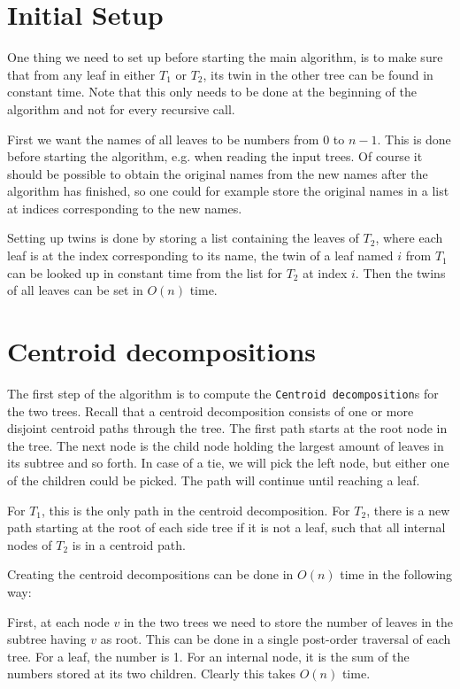 \section{Initial Setup}
One thing we need to set up before starting the main algorithm, is to make sure that from any leaf in either $T_1$ or $T_2$, its twin in the other tree can be found in constant time. Note that this only needs to be done at the beginning of the algorithm and not for every recursive call.

First we want the names of all leaves to be numbers from 0 to $n-1$. This is done before starting the algorithm, e.g. when reading the input trees. Of course it should be possible to obtain the original names from the new names after the algorithm has finished, so one could for example store the original names in a list at indices corresponding to the new names.

Setting up twins is done by storing a list containing the leaves of $T_2$, where each leaf is at the index corresponding to its name, the twin of a leaf named $i$ from $T_1$ can be looked up in constant time from the list for $T_2$ at index $i$. Then the twins of all leaves can be set in $O(n)$ time.

\section{Centroid decompositions}
The first step of the algorithm is to compute the \texttt{Centroid decomposition}s for the two trees. Recall that a centroid decomposition consists of one or more disjoint centroid paths through the tree. The first path starts at the root node in the tree. The next node is the child node holding the largest amount of leaves in its subtree and so forth. In case of a tie, we will pick the left node, but either one of the children could be picked. The path will continue until reaching a leaf.

For $T_1$, this is the only path in the centroid decomposition. For $T_2$, there is a new path starting at the root of each side tree if it is not a leaf, such that all internal nodes of $T_2$ is in a centroid path.

Creating the centroid decompositions can be done in $O(n)$ time in the following way:

First, at each node $v$ in the two trees we need to store the number of leaves in the subtree having $v$ as root. This can be done in a single post-order traversal of each tree. For a leaf, the number is 1. For an internal node, it is the sum of the numbers stored at its two children. Clearly this takes $O(n)$ time.

